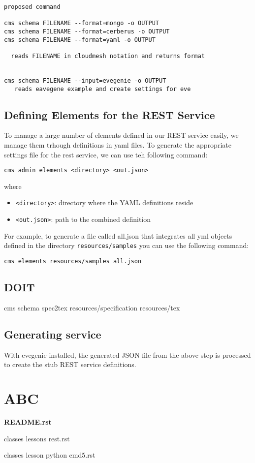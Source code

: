 \documentclass[9pt,twocolumn,twoside]{styles/osajnl}
\begin{document}
\begin{Verbatim}
proposed command

cms schema FILENAME --format=mongo -o OUTPUT
cms schema FILENAME --format=cerberus -o OUTPUT
cms schema FILENAME --format=yaml -o OUTPUT

  reads FILENAME in cloudmesh notation and returns format


cms schema FILENAME --input=evegenie -o OUTPUT
   reads eavegene example and create settings for eve
\end{Verbatim}


\subsection{Defining Elements for the REST Service}

To manage a large number of elements defined in our REST service
easily, we manage them trhough definitions in yaml files. To generate
the appropriate settings file for the rest service, we can use teh
following command:

\begin{verbatim}
cms admin elements <directory> <out.json>
\end{verbatim}

where

\begin{itemize}
\item \verb+<directory>+: directory where the YAML definitions reside
\item \verb+<out.json>+: path to the combined definition
\end{itemize}

For example, to generate a file called all.json that integrates all
yml objects defined in the directory \verb+resources/samples+ you can
use the following command:

\begin{verbatim}
cms elements resources/samples all.json
\end{verbatim}

\subsection{DOIT}


cms schema spec2tex resources/specification resources/tex

\subsection{Generating service}

With evegenie installed, the generated JSON file from the above step
is processed to create the stub REST service definitions.


\section{ABC}
{\bf README.rst}

classes lessons rest.rst

classes lesson python cmd5.rst

\end{document}

